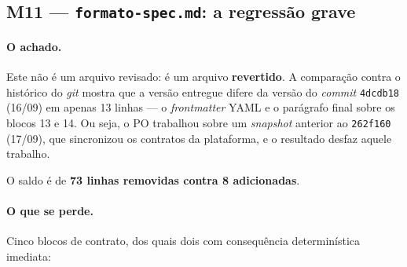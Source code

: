 \documentclass[11pt,a4paper]{article}
\newcommand{\cod}[1]{\texttt{\small #1}}
\begin{document}
\subsection{M11 --- \cod{formato-spec.md}: a regressão grave}
\label{sec:m11}

\paragraph{O achado.} Este não é um arquivo revisado: é um arquivo \textbf{revertido}. A comparação contra o
histórico do \textit{git} mostra que a versão entregue difere da versão do \textit{commit} \cod{4dcdb18}
(16/09) em apenas 13 linhas --- o \textit{frontmatter} YAML e o parágrafo final sobre os blocos 13 e 14. Ou
seja, o PO trabalhou sobre um \textit{snapshot} anterior ao \cod{262f160} (17/09), que sincronizou os
contratos da plataforma, e o resultado desfaz aquele trabalho.

O saldo é de \textbf{73 linhas removidas contra 8 adicionadas}.

\paragraph{O que se perde.} Cinco blocos de contrato, dos quais dois com consequência determinística
imediata:
\end{document}

